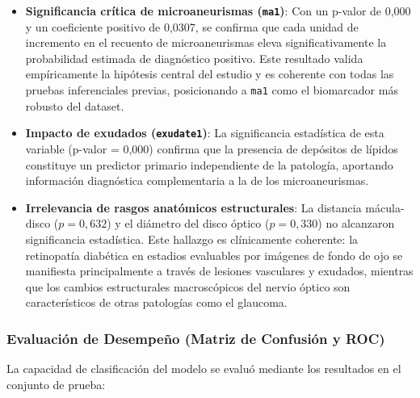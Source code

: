 \begin{itemize}
    \item \textbf{Significancia crítica de microaneurismas (\texttt{ma1})}: Con un
    p-valor de 0,000 y un coeficiente positivo de 0,0307, se confirma que cada unidad
    de incremento en el recuento de microaneurismas eleva significativamente la
    probabilidad estimada de diagnóstico positivo. Este resultado valida empíricamente
    la hipótesis central del estudio y es coherente con todas las pruebas inferenciales
    previas, posicionando a \texttt{ma1} como el biomarcador más robusto del dataset.

    \item \textbf{Impacto de exudados (\texttt{exudate1})}: La significancia estadística
    de esta variable (p-valor = 0,000) confirma que la presencia de depósitos de
    lípidos constituye un predictor primario independiente de la patología, aportando
    información diagnóstica complementaria a la de los microaneurismas.

    \item \textbf{Irrelevancia de rasgos anatómicos estructurales}: La distancia
    mácula-disco ($p = 0{,}632$) y el diámetro del disco óptico ($p = 0{,}330$) no
    alcanzaron significancia estadística. Este hallazgo es clínicamente coherente: la
    retinopatía diabética en estadios evaluables por imágenes de fondo de ojo se
    manifiesta principalmente a través de lesiones vasculares y exudados, mientras que
    los cambios estructurales macroscópicos del nervio óptico son característicos de
    otras patologías como el glaucoma.
\end{itemize}

\subsubsection{Evaluación de Desempeño (Matriz de Confusión y ROC)}

La capacidad de clasificación del modelo se evaluó mediante los resultados en el conjunto
de prueba:

